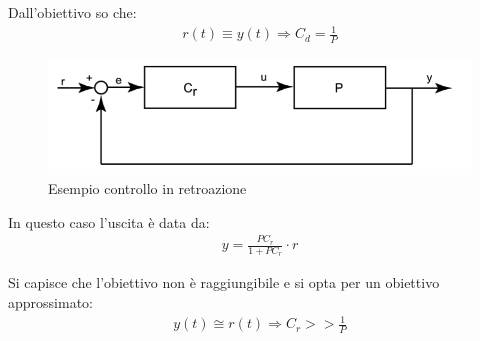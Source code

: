 Dall'obiettivo so che:
\begin{align*}
  r(t) \equiv y(t) \Rightarrow C_d = \frac{1}{P}
\end{align*}

\begin{figure}[h!]
  \centering
  \includegraphics[width=0.5\linewidth]{./images/controllo_retroazione.png}
  \caption{Esempio controllo in retroazione}
  \label{fig:feedback}
\end{figure}

In questo caso l'uscita è data da:
\begin{align*}
  y = \frac{PC_r}{1+PC_r} \cdot r
\end{align*}

Si capisce che l'obiettivo non è raggiungibile e si opta per un obiettivo approssimato:
\begin{align*}
  y(t) \cong r(t) \Rightarrow C_r  >> \frac{1}{P}
\end{align*}

